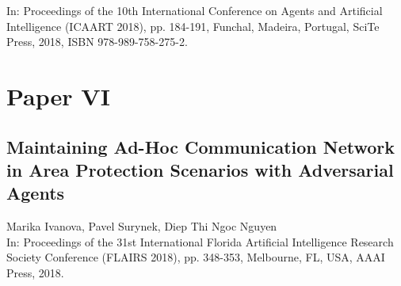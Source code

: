 \noindent In: Proceedings of the 10th International Conference on Agents and Artificial Intelligence (ICAART 2018), pp. 184-191, Funchal, Madeira, Portugal, SciTe Press, 2018, ISBN 978-989-758-275-2. 
\cleardoublepage

\chapter*{Paper VI}
\section{Maintaining Ad-Hoc Communication Network in Area Protection Scenarios with Adversarial Agents}

\noindent Marika Ivanova, Pavel Surynek,  Diep Thi Ngoc Nguyen\\

\noindent In: Proceedings of the 31st International Florida Artificial Intelligence Research Society Conference (FLAIRS 2018), pp. 348-353, Melbourne, FL, USA, AAAI Press, 2018. 
\cleardoublepage

